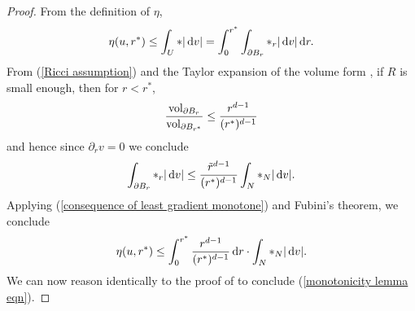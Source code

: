 \begin{proof}
From the definition of $\eta$,
\begin{equation}\label{consequence of least gradient monotone}
    \eta(u, r^*) \leq \int_U *|\mathop{}\!\mathrm{d} v| = \int_0^{r^*} \int_{\partial B_r} *_r |\mathop{}\!\mathrm{d} v| \mathop{}\!\mathrm{d} r.
\end{equation}
From (\ref{Ricci assumption}) and the Taylor expansion of the volume form \cite{gray1974volume}, if $R$ is small enough, then for $r < r^*$,
$$\frac{\mathrm{vol}_{\partial B_r}}{\mathrm{vol}_{\partial B_{r^*}}} \leq \frac{r^{d -1}}{(r^*)^{d - 1}}$$
and hence since $\partial_r v = 0$ we conclude
$$\int_{\partial B_r} *_r |\mathop{}\!\mathrm{d} v| \leq \frac{\tilde r^{d - 1}}{(r^*)^{d - 1}} \int_N *_N |\mathop{}\!\mathrm{d} v|.$$
Applying (\ref{consequence of least gradient monotone}) and Fubini's theorem, we conclude
$$\eta(u, r^*) \leq \int_0^{r^*} \frac{r^{d - 1}}{(r^*)^{d - 1}} \mathop{}\!\mathrm{d} r \cdot \int_N *_N |\mathop{}\!\mathrm{d} v|.$$
We can now reason identically to the proof of \cite[Lemma 5.8]{Giusti77} to conclude (\ref{monotonicity lemma eqn}).
\end{proof}

